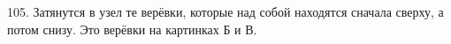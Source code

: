 105. Затянутся в узел те верёвки, которые над собой находятся сначала сверху, а потом снизу. Это верёвки на картинках Б и В.\\
